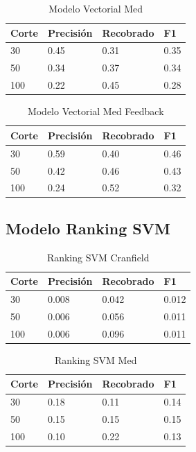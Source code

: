 \documentclass[runningheads]{llncs}
\begin{document}
\begin{table}
	\caption{Modelo Vectorial Med}\label{med_vec_result}
 \begin{tabular}{|l|l|l|l|}
 \hline
 	Corte &  Precisión & Recobrado & F1\\
 \hline
	30 & 0.45 & 0.31 & 0.35\\
	50 & 0.34 & 0.37 & 0.34\\
	100 & 0.22 & 0.45 & 0.28\\
 \hline
 \end{tabular}
\end{table}


\begin{table}
	\caption{Modelo Vectorial Med Feedback}\label{med_vec_feed_result}
 \begin{tabular}{|l|l|l|l|}
 \hline
 	Corte &  Precisión & Recobrado & F1\\
 \hline
	30 & 0.59 & 0.40 & 0.46\\
	50 & 0.42 & 0.46 & 0.43\\
	100 & 0.24 & 0.52 & 0.32\\
 \hline
 \end{tabular}
\end{table}

\newpage

\subsection{Modelo Ranking SVM}


\begin{table}
	\caption{Ranking SVM Cranfield}\label{cran_svm_result}
 \begin{tabular}{|l|l|l|l|}
 \hline
 	Corte &  Precisión & Recobrado & F1\\
 \hline
	30 & 0.008 & 0.042 & 0.012\\
	50 & 0.006 & 0.056 & 0.011\\
	100 & 0.006 & 0.096 & 0.011\\
 \hline
 \end{tabular}
\end{table}


\begin{table}
	\caption{Ranking SVM Med}\label{med_svm_result}
 \begin{tabular}{|l|l|l|l|}
 \hline
 	Corte &  Precisión & Recobrado & F1\\
 \hline
	30 & 0.18 & 0.11 & 0.14\\
	50 & 0.15 & 0.15 & 0.15\\
	100 & 0.10 & 0.22 & 0.13\\
 \hline
 \end{tabular}
\end{table}
\end{document}
